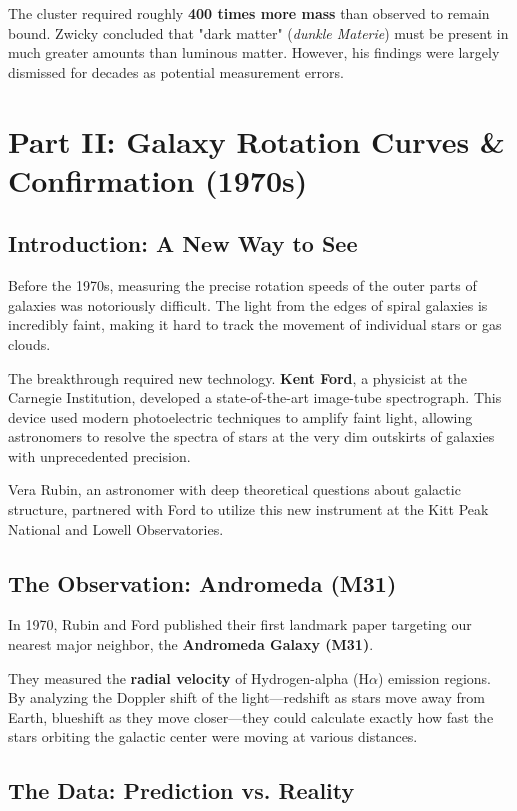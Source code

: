\documentclass[11pt, a4paper]{article}
\begin{document}
The cluster required roughly \textbf{400 times more mass} than observed to remain bound. Zwicky concluded that "dark matter" (\textit{dunkle Materie}) must be present in much greater amounts than luminous matter. However, his findings were largely dismissed for decades as potential measurement errors.

\newpage

\section{Part II: Galaxy Rotation Curves \& Confirmation (1970s)}

\subsection{Introduction: A New Way to See}
Before the 1970s, measuring the precise rotation speeds of the outer parts of galaxies was notoriously difficult. The light from the edges of spiral galaxies is incredibly faint, making it hard to track the movement of individual stars or gas clouds.

The breakthrough required new technology. \textbf{Kent Ford}, a physicist at the Carnegie Institution, developed a state-of-the-art image-tube spectrograph. This device used modern photoelectric techniques to amplify faint light, allowing astronomers to resolve the spectra of stars at the very dim outskirts of galaxies with unprecedented precision.

Vera Rubin, an astronomer with deep theoretical questions about galactic structure, partnered with Ford to utilize this new instrument at the Kitt Peak National and Lowell Observatories.

\subsection{The Observation: Andromeda (M31)}
In 1970, Rubin and Ford published their first landmark paper targeting our nearest major neighbor, the \textbf{Andromeda Galaxy (M31)}.

They measured the \textbf{radial velocity} of Hydrogen-alpha (H$\alpha$) emission regions. By analyzing the Doppler shift of the light—redshift as stars move away from Earth, blueshift as they move closer—they could calculate exactly how fast the stars orbiting the galactic center were moving at various distances.

\subsection{The Data: Prediction vs. Reality}
\end{document}
